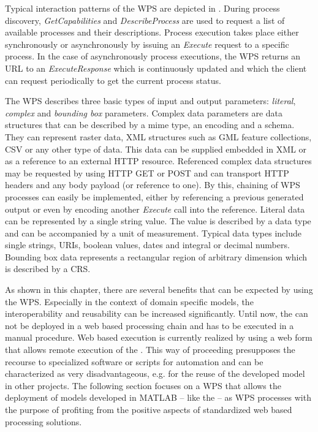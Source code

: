 	Typical interaction patterns of the \acl{WPS} are depicted in . During process discovery, \emph{GetCapabilities} and \emph{DescribeProcess} are used to request a list of available processes and their descriptions. Process execution takes place either synchronously or asynchronously by issuing an \emph{Execute} request to a specific process. In the case of asynchronously process executions, the \ac{WPS} returns an URL to an \emph{ExecuteResponse} which is continuously updated and which the client can request periodically to get the current process status.

	The \ac{WPS} describes three basic types of input and output parameters: \emph{literal}, \emph{complex} and \emph{bounding box} parameters. Complex data parameters are data structures that can be described by a mime type, an encoding and a schema. They can represent raster data, XML structures such as \ac{GML} \citep{ogc:gml} feature collections, \ac{CSV} or any other type of data. This data can be supplied embedded in XML or as a reference to an external HTTP resource. Referenced complex data structures may be requested by using HTTP GET or POST and can transport HTTP headers and any body payload (or reference to one). By this, chaining of \ac{WPS} processes can easily be implemented, either by referencing a previous generated output or even by encoding another \emph{Execute} call into the reference. Literal data can be represented by a single string value. The value is described by a data type and can be accompanied by a unit of measurement. Typical data types include single strings, URIs, boolean values, dates and integral or decimal numbers. Bounding box data represents a rectangular region of arbitrary dimension which is described by a \ac{CRS}.

	As shown in this chapter, there are several benefits that can be expected by using the WPS. Especially in the context of domain specific models, the interoperability and reusability can be increased significantly. Until now, the \la can not be deployed in a web based processing chain and has to be executed in a manual procedure. Web based execution is currently realized by using a web form that allows remote execution of the \la. This way of proceeding presupposes the recourse to specialized software or scripts for automation and can be characterized as very disadvantageous, e.g. for the reuse of the developed model in other projects. The following section focuses on a WPS that allows the deployment of models developed in MATLAB -- like the \la -- as WPS processes with the purpose of profiting from the positive aspects of standardized web based processing solutions.

